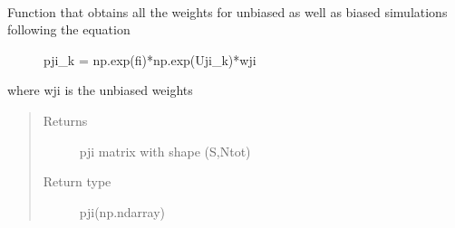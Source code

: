 \documentclass[letterpaper,10pt,english]{sphinxmanual}
\begin{document}
\begin{fulllineitems}
\begin{fulllineitems}
\begin{quote}
\begin{description}
\begin{enumerate}
\end{enumerate}


\end{description}\end{quote}

\end{fulllineitems}


\begin{fulllineitems}
\label{\detokenize{wham:wham.Uwham.Uwham.get_pji}}~\begin{description}
\item[{Function that obtains all the weights for unbiased as well as biased simulations following the equation}] \leavevmode
pji\_k = np.exp(fi)*np.exp(\sphinxhyphen{}Uji\_k)*wji

\end{description}

where wji is the unbiased weights
\begin{quote}\begin{description}
\item[{Returns}] \leavevmode
pji matrix with shape (S,Ntot)

\item[{Return type}] \leavevmode
pji(np.ndarray)

\end{description}\end{quote}

\end{fulllineitems}


\end{fulllineitems}

\end{document}

